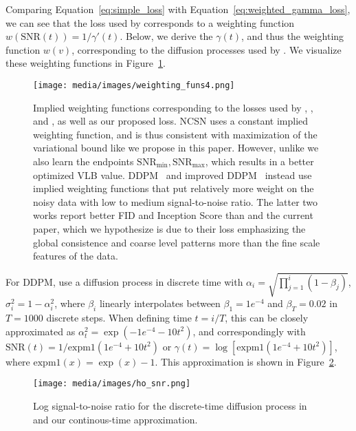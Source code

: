 \documentclass{article}
\def\Eqref#1{Equation~\ref{#1}}
\newcommand{\snr}{\text{SNR}}
\newcommand{\snrmin}{\text{SNR}_{\text{min}}}
\newcommand{\snrmax}{\text{SNR}_{\text{max}}}
\begin{document}
Comparing \Eqref{eq:simple_loss}
with \Eqref{eq:weighted_gamma_loss}, we can see that the loss used by \cite{ho2020denoising,song2019generative,nichol2021improved} corresponds to a weighting function $w(\snr(t))=1/\gamma'(t)$. Below, we derive the $\gamma(t)$, and thus the weighting function $w(v)$, corresponding to the diffusion processes used by \cite{ho2020denoising,song2019generative,nichol2021improved}. We visualize these weighting functions in Figure~\ref{fig:weighting_funs}.
\begin{figure}[htb]
    \centering
    \texttt{[image: media/images/weighting\_funs4.png]}
    \caption{Implied weighting functions corresponding to the losses used by \cite{ho2020denoising}, \cite{song2020denoising}, and \cite{nichol2021improved}, as well as our proposed loss. NCSN \citep{song2020denoising} uses a constant implied weighting function, and is thus consistent with maximization of the variational bound like we propose in this paper. However, unlike \cite{song2019generative} we also learn the endpoints $\snrmin,\snrmax$, which results in a better optimized VLB value. DDPM~\citep{ho2020denoising} and improved DDPM~\citep{nichol2021improved} instead use implied weighting functions that put relatively more weight on the noisy data with low to medium signal-to-noise ratio. The latter two works report better FID and Inception Score than \cite{song2020denoising} and the current paper, which we hypothesize is due to their loss emphasizing the global consistence and coarse level patterns more than the fine scale features of the data.}
    \label{fig:weighting_funs}
\end{figure}

For DDPM, \cite{ho2020denoising} use a diffusion process in discrete time with $\alpha_i = \sqrt{\prod_{j=1}^{i}(1-\beta_j)}$, $\sigma^{2}_i = 1 - \alpha^{2}_i$, where $\beta_i$ linearly interpolates between $\beta_{1}=1e^{-4}$ and $\beta_{T}=0.02$ in $T=1000$ discrete steps. When defining time $t = i/T$, this can be closely approximated as $\alpha^{2}_t = \exp(-1e^{-4} - 10t^{2})$, and correspondingly with $\snr(t) = 1/\text{expm1}(1e^{-4} + 10t^{2})$ or $\gamma(t) = \log[\text{expm1}(1e^{-4} + 10t^{2})]$, where $\text{expm1}(x) = \exp(x)-1$. This approximation is shown in Figure~\ref{fig:ho_snr}.
\begin{figure}[htb]
    \centering
    \texttt{[image: media/images/ho\_snr.png]}
    \caption{Log signal-to-noise ratio for the discrete-time diffusion process in \cite{ho2020denoising} and our continous-time approximation.}
    \label{fig:ho_snr}
\end{figure}
\end{document}
